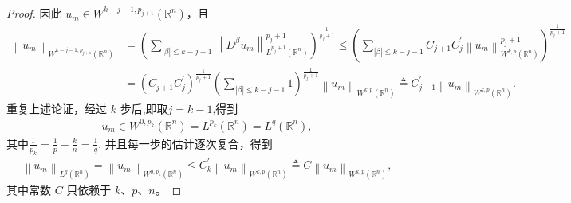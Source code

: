 \documentclass[../../main.tex]{subfiles}
\begin{document}
\begin{proof}
因此 $u_{m}\in W^{k-j-1,p_{j+1}}(\mathbb{R}^{n})$，且
\begin{align*}
\left\| u_m \right\| _{W^{k-j-1,p_{j+1}}\left( \mathbb{R} ^n \right)}&=\left( \sum_{\left| \beta \right|\leqslant k-j-1}{\left\| D^{\beta}u_m \right\| _{L^{p_j+1}\left( \mathbb{R} ^n \right)}^{p_j+1}} \right) ^{\frac{1}{p_j+1}}\leqslant \left( \sum_{\left| \beta \right|\leqslant k-j-1}{C_{j+1}C_{j}^{\prime}\left\| u_m \right\| _{W^{k,p}\left( \mathbb{R} ^n \right)}^{p_j+1}} \right) ^{\frac{1}{p_j+1}}
\\
&=\left( C_{j+1}C_{j}^{\prime} \right) ^{\frac{1}{p_j+1}}\left( \sum_{\left| \beta \right|\leqslant k-j-1}{1} \right) ^{\frac{1}{p_j+1}}\left\| u_m \right\| _{W^{k,p}\left( \mathbb{R} ^n \right)}\triangleq C_{j+1}^{\prime}\left\| u_m \right\| _{W^{k,p}\left( \mathbb{R} ^n \right)}.
\end{align*}
重复上述论证，经过 $k$ 步后,即取$j=k-1$,得到
\begin{align*}
u_{m}\in W^{0,p_{k}}(\mathbb{R}^{n})=L^{p_{k}}(\mathbb{R}^{n})=L^{q}(\mathbb{R}^{n}),
\end{align*}
其中$\frac{1}{p_{k}}=\frac{1}{p}-\frac{k}{n}=\frac{1}{q}$.
并且每一步的估计逐次复合，得到
\begin{align*}
\left\| u_m \right\| _{L^q(\mathbb{R} ^n)}=\left\| u_m \right\| _{W^{0,p_k}\left( \mathbb{R} ^n \right)}\leqslant C_{k}^{\prime}\left\| u_m \right\| _{W^{k,p}(\mathbb{R} ^n)}\triangleq C\left\| u_m \right\| _{W^{k,p}(\mathbb{R} ^n)},
\end{align*}
其中常数 $C$ 只依赖于 $k$、$p$、$n$。


\end{proof}
\end{document}
